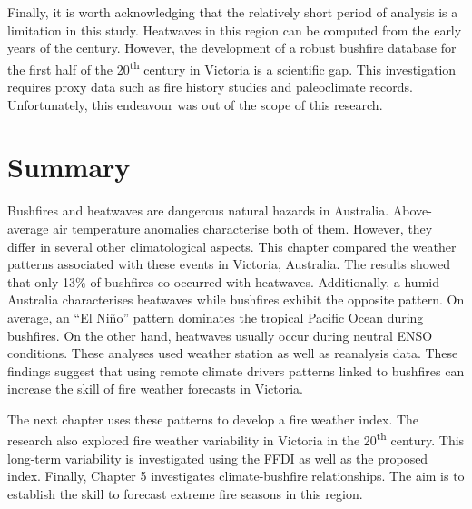 Finally, it is worth acknowledging that the relatively short period
of analysis is a limitation in this study. Heatwaves in this region
can be computed from the early years of the century. However, the
development of a robust bushfire database for the first half of the
20\textsuperscript{th} century in Victoria is a scientific gap. This
investigation requires proxy data such as fire history studies and
paleoclimate records. Unfortunately, this endeavour was out of the
scope of this research.


\section{Summary}

Bushfires and heatwaves are dangerous natural hazards in Australia.
Above-average air temperature anomalies characterise both of them.
However, they differ in several other climatological aspects. This
chapter compared the weather patterns associated with these events
in Victoria, Australia. The results showed that only 13\% of bushfires
co-occurred with heatwaves. Additionally, a humid Australia characterises
heatwaves while bushfires exhibit the opposite pattern. On average,
an ``El Ni\~no'' pattern dominates the tropical Pacific Ocean during
bushfires. On the other hand, heatwaves usually occur during neutral
ENSO conditions. These analyses used weather station as well as reanalysis
data. These findings suggest that using remote climate drivers patterns
linked to bushfires can increase the skill of fire weather forecasts
in Victoria.

The next chapter uses these patterns to develop a fire weather index.
The research also explored fire weather variability in Victoria in
the 20\textsuperscript{th} century. This long-term variability is
investigated using the FFDI as well as the proposed index. Finally,
Chapter 5 investigates climate-bushfire relationships. The aim is
to establish the skill to forecast extreme fire seasons in this region.


